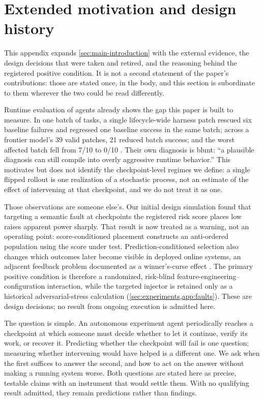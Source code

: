 \section{Extended motivation and design history}
\label{sec:motivation}

This appendix expands \cref{sec:main-introduction} with the external evidence,
the design decisions that were taken and retired, and the reasoning behind the
registered positive condition.  It is not a second statement of the paper's
contributions: those are stated once, in the body, and this section is
subordinate to them wherever the two could be read differently.

Runtime evaluation of agents already shows the gap this paper is built to
measure.  In one batch of tasks, a single lifecycle-wide harness patch rescued
six baseline failures and regressed one baseline success in the same batch;
across a frontier model's 39 valid patches, 21 reduced batch success; and the
worst affected batch fell from 7/10 to 0/10 \citep{harnessr12026}.  Their own
diagnosis is blunt: ``a plausible diagnosis can still compile into overly
aggressive runtime behavior.''  This motivates but does not identify the
checkpoint-level regimes we define: a single flipped rollout is one realization
of a stochastic process, not an estimate of the effect of intervening at that
checkpoint, and we do not treat it as one.

Those observations are someone else's.  Our initial design simulation found
that targeting a semantic fault at checkpoints the registered risk score places
low raises apparent power sharply.  That result is now treated as a warning,
not an operating point: score-conditioned placement constructs an anti-ordered
population using the score under test.  Prediction-conditioned selection also
changes which outcomes later become visible in deployed online systems, an
adjacent feedback problem documented as a winner's-curse effect
\citep{staleness2026}.  The primary positive condition is
therefore a randomized, risk-blind feature-engineering--configuration
interaction, while the targeted injector is retained only as a historical
adversarial-stress calculation (\cref{sec:experiments,app:faults}).  These are
design decisions; no result from ongoing execution is admitted here.

The question is simple.  An autonomous experiment agent periodically reaches a
checkpoint at which someone must decide whether to let it continue, verify its
work, or recover it.  Predicting whether the checkpoint will fail is one
question; measuring whether intervening would have helped is a different one.
We ask when the first suffices to answer the second, and how to act on the
answer without making a running system worse.  Both questions are stated here
as precise, testable claims with an instrument that would settle them.  With no
qualifying result admitted, they remain predictions rather than findings.

